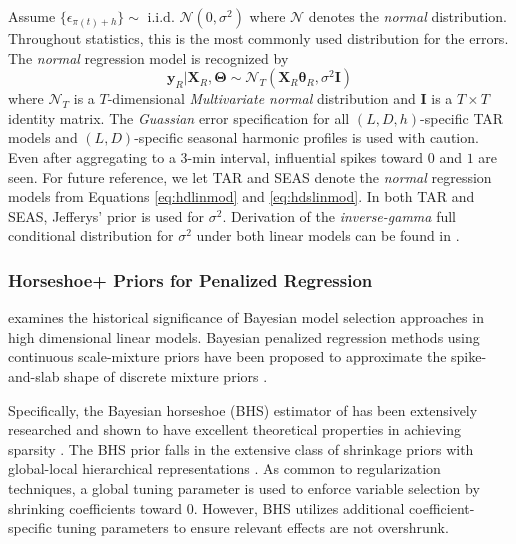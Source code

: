 Assume $\{\epsilon_{\pi(t)+h}\} \sim \textrm{ i.i.d. }\mathcal{N}(0,\sigma^2)$ where $\mathcal{N}$ denotes the \textit{normal} distribution. Throughout statistics, this is the most commonly used distribution for the errors. The \textit{normal} regression model is recognized by 
\begin{equation}
\label{eq:normalmod}
\bm{y}_R|\bm{X}_R,\bm{\Theta}\sim \mathcal{N}_T(\bm{X}_R\bm{\theta}_R,\sigma^2\bm{I})
\end{equation}
where $\mathcal{N}_T$ is a $T$-dimensional \textit{Multivariate normal} distribution and $\bm{I}$ is a $T\times T$ identity matrix. The \textit{Guassian} error specification for all $(L,D,h)$-specific TAR models and $(L,D)$-specific seasonal harmonic profiles is used with caution. Even after aggregating to a 3-min interval, influential spikes toward $0$ and $1$ are seen. For future reference, we let TAR and SEAS denote the \textit{normal} regression models from Equations \ref{eq:hdlinmod} and \ref{eq:hdslinmod}. In both TAR and SEAS, Jefferys' prior is used for $\sigma^2$. Derivation of the \textit{inverse-gamma} full conditional distribution for $\sigma^2$ under both linear models can be found in \cite{bayesreg}.

\subsubsection{Horseshoe+ Priors for Penalized Regression}

\cite{Mallick2013} examines the historical significance of Bayesian model selection approaches in high dimensional linear models. Bayesian penalized regression methods using continuous scale-mixture priors \citep{OHara2009,Polson2010} have been proposed to approximate the spike-and-slab shape of discrete mixture priors \citep{Mitchell1988,George1993,Madigan1994,Carlin1995,Kuo1998,Ishwaran2005,Ishwaran2011}.

Specifically, the Bayesian horseshoe (BHS) estimator of \citep{Carvalho2009,Carvalho2010} has been extensively researched and shown to have excellent theoretical properties in achieving sparsity \citep{Polson2012,Datta2013,vanderPas2014}. The BHS prior falls in the extensive class of shrinkage priors with global-local hierarchical representations \citep{Polson2010}. As common to regularization techniques, a global tuning parameter is used to enforce variable selection by shrinking coefficients toward 0. However, BHS utilizes additional coefficient-specific tuning parameters to ensure relevant effects are not overshrunk. 

